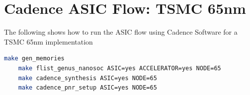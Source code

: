 \documentclass{report}
\begin{document}
\section{Cadence ASIC Flow: TSMC 65nm}
The following shows how to run the ASIC flow using Cadence Software for a TSMC 65nm implementation

\begin{lstlisting}[language=bash]
    make gen_memories
    make flist_genus_nanosoc ASIC=yes ACCELERATOR=yes NODE=65
    make cadence_synthesis ASIC=yes NODE=65
    make cadence_pnr_setup ASIC=yes NODE=65
\end{lstlisting}
\end{document}
